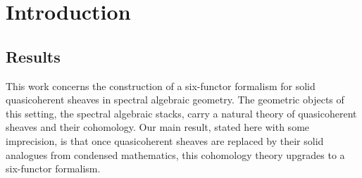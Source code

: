 \section{Introduction}\label{sec: introduction}
\subsection{Results}\label{subsec: intro results}
This work concerns the construction of a six-functor formalism for solid quasicoherent sheaves in spectral algebraic geometry. The geometric objects of this setting, the spectral algebraic stacks, carry a natural theory of quasicoherent sheaves and their cohomology. Our main result, stated here with some imprecision, is that once quasicoherent sheaves are replaced by their solid analogues from condensed mathematics, this cohomology theory upgrades to a six-functor formalism.
